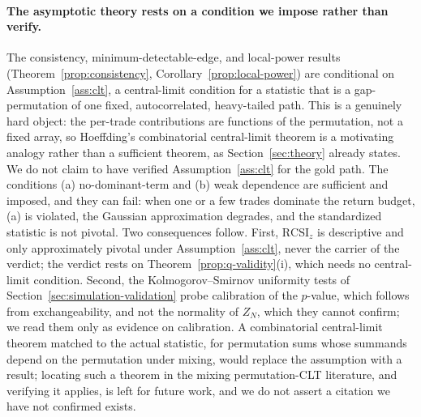 \documentclass[preprint,12pt]{elsarticle}
\theoremstyle{definition}
\begin{document}
\paragraph{The asymptotic theory rests on a condition we impose rather than verify.}
The consistency, minimum-detectable-edge, and local-power results
(Theorem~\ref{prop:consistency}, Corollary~\ref{prop:local-power}) are
conditional on Assumption~\ref{ass:clt}, a central-limit condition for a statistic
that is a gap-permutation of one fixed, autocorrelated, heavy-tailed path. This is a
genuinely hard object: the per-trade contributions are functions of the permutation,
not a fixed array, so Hoeffding's combinatorial central-limit theorem is a motivating
analogy rather than a sufficient theorem, as Section~\ref{sec:theory} already states.
We do not claim to have verified Assumption~\ref{ass:clt} for the gold path. The
conditions (a) no-dominant-term and (b) weak dependence are sufficient and imposed,
and they can fail: when one or a few trades dominate the return budget, (a) is
violated, the Gaussian approximation degrades, and the standardized statistic is not
pivotal. Two consequences follow. First, $\mathrm{RCSI}_z$ is descriptive and only
approximately pivotal under Assumption~\ref{ass:clt}, never the carrier of the
verdict; the verdict rests on Theorem~\ref{prop:q-validity}(i), which needs no
central-limit condition. Second, the Kolmogorov--Smirnov uniformity tests of
Section~\ref{sec:simulation-validation} probe calibration of the $p$-value, which
follows from exchangeability, and not the normality of $Z_N$, which they cannot
confirm; we read them only as evidence on calibration. A combinatorial central-limit
theorem matched to the actual statistic, for permutation sums whose summands depend on
the permutation under mixing, would replace the assumption with a result; locating
such a theorem in the mixing permutation-CLT literature, and verifying it applies, is
left for future work, and we do not assert a citation we have not confirmed exists.
\end{document}
